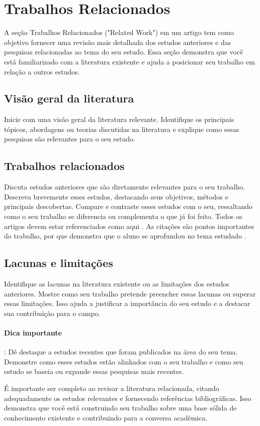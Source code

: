 \section{Trabalhos Relacionados}\label{:relatedwork}

A seção Trabalhos Relacionados ("Related Work") em um artigo tem como objetivo fornecer uma revisão mais detalhada dos estudos anteriores e das pesquisas relacionadas ao tema do seu estudo. Essa seção demonstra que você está familiarizado com a literatura existente e ajuda a posicionar seu trabalho em relação a outros estudos.

\subsection{Visão geral da literatura} 
Inicie com uma visão geral da literatura relevante. Identifique os principais tópicos, abordagens ou teorias discutidas na literatura e explique como essas pesquisas são relevantes para o seu estudo.

\subsection{Trabalhos relacionados}
Discuta estudos anteriores que são diretamente relevantes para o seu trabalho. Descreva brevemente esses estudos, destacando seus objetivos, métodos e principais descobertas. Compare e contraste esses estudos com o seu, ressaltando como o seu trabalho se diferencia ou complementa o que já foi feito. Todos os artigos devem estar referenciados como aqui \cite{b2}. As citações são pontos importantes do trabalho, por que demonstra que o aluno se aprofundou no tema estudado \cite{b4}.

\subsection{Lacunas e limitações}
Identifique as lacunas na literatura existente ou as limitações dos estudos anteriores. Mostre como seu trabalho pretende preencher essas lacunas ou superar essas limitações. Isso ajuda a justificar a importância do seu estudo e a destacar sua contribuição para o campo.

\paragraph{Dica importante}: Dê destaque a estudos recentes que foram publicados na área do seu tema. Demonstre como esses estudos estão alinhados com o seu trabalho e como seu estudo se baseia ou expande essas pesquisas mais recentes.

É importante ser completo ao revisar a literatura relacionada, citando adequadamente os estudos relevantes e fornecendo referências bibliográficas. Isso demonstra que você está construindo seu trabalho sobre uma base sólida de conhecimento existente e contribuindo para a conversa acadêmica.